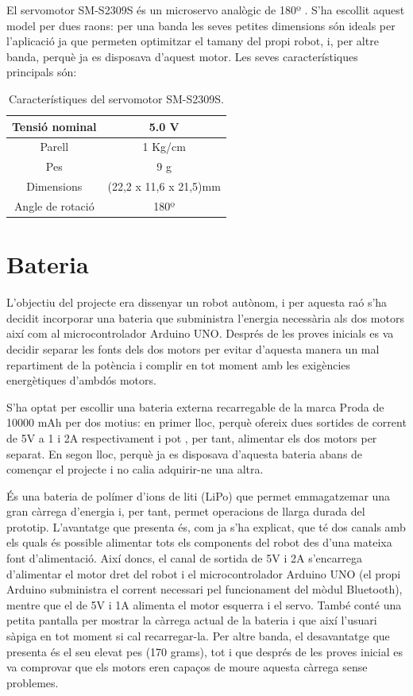 El servomotor SM-S2309S és un microservo analògic de 180º \cite{servobib}. S'ha escollit aquest model per dues raons: per una banda les seves petites dimensions són ideals per l'aplicació ja que permeten optimitzar el tamany del propi robot, i, per altre banda, perquè ja es disposava d'aquest motor. Les seves característiques principals són:  

\begin{table}[htbp]
	\begin{center}
		\begin{tabular}{|c|c|}
			\hline
			
			Tensió nominal & 5.0 V  \\ \hline
			Parell & 1 Kg/cm  \\ \hline
			Pes & 9 g  \\ \hline
			Dimensions & (22,2 x 11,6 x 21,5)mm  \\ \hline
			Angle de rotació & 180º  \\ \hline
		\end{tabular}
		\caption{Característiques del servomotor SM-S2309S.}
		\label{tabla:servo}
	\end{center}
\end{table}
\section{Bateria}\label{sec:bateria}

L’objectiu del projecte era dissenyar un robot autònom, i per aquesta raó s’ha decidit incorporar una bateria que subministra l’energia necessària als dos motors així com al microcontrolador Arduino UNO. Després de les proves inicials es va decidir separar les fonts dels dos motors per evitar d’aquesta manera un mal repartiment de la potència i complir en tot moment amb les exigències energètiques d’ambdós motors. 

S’ha optat per escollir una bateria externa recarregable de la marca Proda de 10000 mAh per dos motius: en primer lloc, perquè ofereix dues sortides de corrent de 5V a 1 i 2A respectivament i pot , per tant, alimentar els dos motors per separat. En segon lloc, perquè ja es disposava d'aquesta bateria abans de començar el projecte i no calia adquirir-ne una altra. 

És una bateria de polímer d’ions de liti (LiPo) que permet emmagatzemar una gran càrrega d’energia i, per tant, permet operacions de llarga durada del prototip. L’avantatge que presenta és, com ja s’ha explicat, que té dos canals amb els quals és possible alimentar tots els components del robot des d'una mateixa font d'alimentació. Així doncs, el canal de sortida de 5V i 2A s’encarrega d’alimentar el motor dret del robot i el microcontrolador Arduino UNO (el propi Arduino subministra el corrent necessari pel funcionament del mòdul Bluetooth), mentre que el de 5V i 1A alimenta el motor esquerra i el servo. També conté una petita pantalla per mostrar la càrrega actual de la bateria i que així l’usuari sàpiga en tot moment si cal recarregar-la. Per altre banda, el desavantatge que presenta és el seu elevat pes (170 grams), tot i que després de les proves inicial es va comprovar que els motors eren capaços de moure aquesta càrrega sense problemes. 

